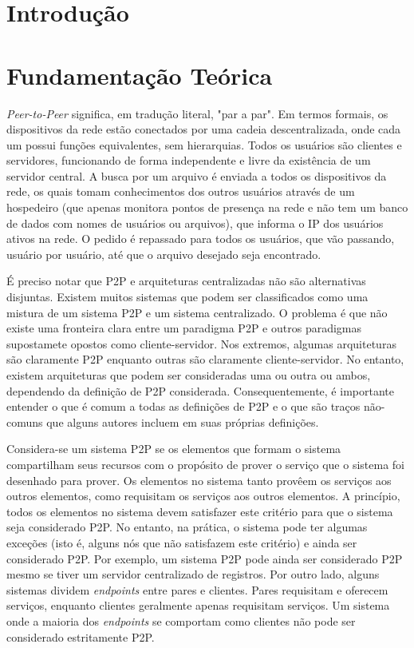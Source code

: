 \documentclass[a4paper]{article}
\begin{document}
\tableofcontents
\newpage
{}

\section{Introdução}
\newpage

\section{Fundamentação Teórica}
\textit{Peer-to-Peer} significa, em tradução literal, "par a par". Em termos formais, os dispositivos da rede estão conectados por uma cadeia descentralizada, onde cada um possui funções equivalentes, sem hierarquias. Todos os usuários são clientes e servidores, funcionando de forma independente e livre da existência de um servidor central. A busca por um arquivo é enviada a todos os dispositivos da rede, os quais tomam conhecimentos dos outros usuários através de um hospedeiro (que apenas monitora pontos de presença na rede e não tem um banco de dados com nomes de usuários ou arquivos), que informa o IP dos usuários ativos na rede. O pedido é repassado para todos os usuários, que vão passando, usuário por usuário, até que o arquivo desejado seja encontrado.\cite{sisp2p}

É preciso notar que P2P e arquiteturas centralizadas não são alternativas disjuntas. Existem muitos sistemas que podem ser classificados como uma mistura de um sistema P2P e um sistema centralizado. O problema é que não existe uma fronteira clara entre um paradigma P2P e outros paradigmas supostamete opostos como cliente-servidor. Nos extremos, algumas arquiteturas são claramente P2P enquanto outras são claramente cliente-servidor. No entanto, existem arquiteturas que podem ser consideradas uma ou outra ou ambos, dependendo da definição de P2P considerada. Consequentemente, é importante entender o que é comum a todas as definições de P2P e o que são traços não-comuns que alguns autores incluem em suas próprias definições.\cite{camarillop2parch}

Considera-se um sistema P2P se os elementos que formam o sistema compartilham seus recursos com o propósito de prover o serviço que o sistema foi desenhado para prover. Os elementos no sistema tanto provêem os serviços aos outros elementos, como requisitam os serviços aos outros elementos. A princípio, todos os elementos no sistema devem satisfazer este critério para que o sistema seja considerado P2P. No entanto, na prática, o sistema pode ter algumas exceções (isto é, alguns nós que não satisfazem este critério) e ainda ser considerado P2P. Por exemplo, um sistema P2P pode ainda ser considerado P2P mesmo se tiver um servidor centralizado de registros. Por outro lado, alguns sistemas dividem \textit{endpoints} entre pares e clientes. Pares requisitam e oferecem serviços, enquanto clientes geralmente apenas requisitam serviços. Um sistema onde a maioria dos \textit{endpoints} se comportam como clientes não pode ser considerado estritamente P2P. \cite{camarillop2parch}
\end{document}
